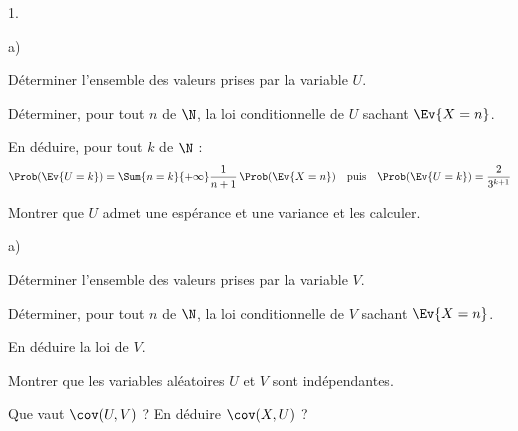 \begin{noliste}{1.}
  \setlength{\itemsep}{4mm}
  \setcounter{enumi}{1}
  \item 
  \begin{noliste}{a)}
    \setlength{\itemsep}{2mm}
    \item Déterminer l'ensemble des valeurs prises par la variable $U$.
    
    
    
    

    
    \item Déterminer, pour tout $n$ de $\N$, la loi conditionnelle de 
    $U$ sachant $\Ev{X=n}$.
    
    

    
    \item En déduire, pour tout $k$ de $\N$ :
    \[
      \Prob(\Ev{U=k}) = \Sum{n=k}{+\infty} \dfrac{1}{n+1} \, 
      \Prob(\Ev{X=n}) \quad \text{puis} \quad \Prob(\Ev{U=k}) = 
      \dfrac{2}{3^{k+1}}
    \]
    
    
    
    \item Montrer que $U$ admet une espérance et une variance et les 
    calculer.
    
    
  \end{noliste}
  
  
  
  
  \item 
  \begin{noliste}{a)}
    \setlength{\itemsep}{2mm}
    \item Déterminer l'ensemble des valeurs prises par la variable $V$.
    
    
    
    \item Déterminer, pour tout $n$ de $\N$, la loi conditionnelle de 
    $V$ sachant $\Ev{X=n}$.
    
    
    
    

    
    \item En déduire la loi de $V$.
    
    
  \end{noliste}
  
  \item Montrer que les variables aléatoires $U$ et $V$ sont 
  indépendantes.
  
  

  
  \item Que vaut $\cov(U,V)$ ? En déduire $\cov(X,U)$ ?
  
  
\end{noliste}



